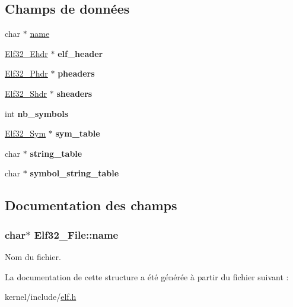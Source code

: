 \subsection*{Champs de données}
\begin{DoxyCompactItemize}
\item 
char $\ast$ \hyperlink{structElf32__File_ad72bb34e9388d51790c6059cdd122137}{name}
\item 
\hypertarget{structElf32__File_ac8df03922d25955e8e597c061a5e228e}{\hyperlink{structElf32__Ehdr}{Elf32\-\_\-\-Ehdr} $\ast$ {\bfseries elf\-\_\-header}}\label{structElf32__File_ac8df03922d25955e8e597c061a5e228e}

\item 
\hypertarget{structElf32__File_a6ff1304dbfdc29691fc0756faeebf2b1}{\hyperlink{structElf32__Phdr}{Elf32\-\_\-\-Phdr} $\ast$ {\bfseries pheaders}}\label{structElf32__File_a6ff1304dbfdc29691fc0756faeebf2b1}

\item 
\hypertarget{structElf32__File_aa62b3fae81faacc3ede185f4ada96d65}{\hyperlink{structElf32__Shdr}{Elf32\-\_\-\-Shdr} $\ast$ {\bfseries sheaders}}\label{structElf32__File_aa62b3fae81faacc3ede185f4ada96d65}

\item 
\hypertarget{structElf32__File_a153a673f289468d35118dae8299d96aa}{int {\bfseries nb\-\_\-symbols}}\label{structElf32__File_a153a673f289468d35118dae8299d96aa}

\item 
\hypertarget{structElf32__File_a9fb4df42bf3b43251eb3657d4acc7a71}{\hyperlink{structElf32__Sym}{Elf32\-\_\-\-Sym} $\ast$ {\bfseries sym\-\_\-table}}\label{structElf32__File_a9fb4df42bf3b43251eb3657d4acc7a71}

\item 
\hypertarget{structElf32__File_a0b326fa5b82dc0d378b5c28608796ae6}{char $\ast$ {\bfseries string\-\_\-table}}\label{structElf32__File_a0b326fa5b82dc0d378b5c28608796ae6}

\item 
\hypertarget{structElf32__File_abe6e60d88f24c924a8bf536f4d76d724}{char $\ast$ {\bfseries symbol\-\_\-string\-\_\-table}}\label{structElf32__File_abe6e60d88f24c924a8bf536f4d76d724}

\end{DoxyCompactItemize}


\subsection{Documentation des champs}
\hypertarget{structElf32__File_ad72bb34e9388d51790c6059cdd122137}{
\subsubsection[{name}]{\setlength{\rightskip}{0pt plus 5cm}char$\ast$ Elf32\-\_\-\-File\-::name}}\label{structElf32__File_ad72bb34e9388d51790c6059cdd122137}
Nom du fichier. 

La documentation de cette structure a été générée à partir du fichier suivant \-:\begin{DoxyCompactItemize}
\item 
kernel/include/\hyperlink{elf_8h}{elf.\-h}\end{DoxyCompactItemize}
